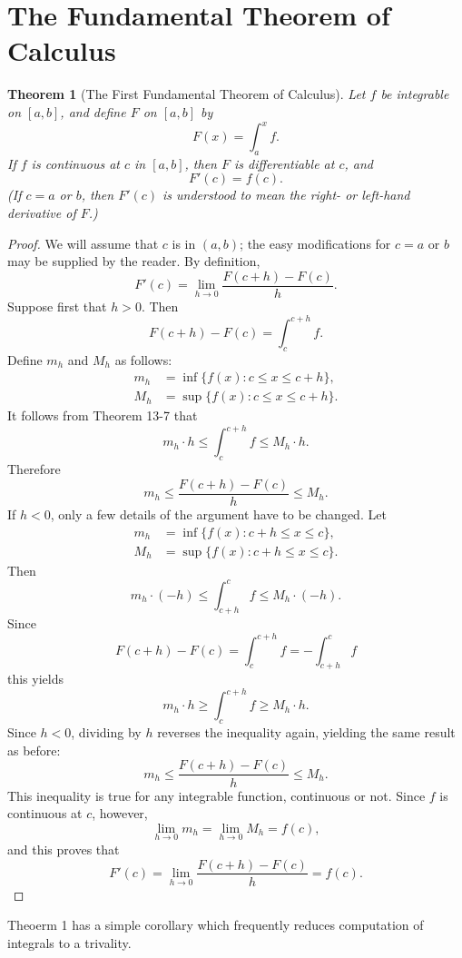 \documentclass{article}
\numberwithin{corollary}{subsection}
\numberwithin{definition}{subsection}
\numberwithin{lemma}{subsection}
\newtheorem{theorem}{Theorem}
\numberwithin{theorem}{subsection}
\begin{document}
\section{The Fundamental Theorem of Calculus}

\begin{theorem}[The First Fundamental Theorem of Calculus]
  Let $f$ be integrable on $[a, b]$, and define $F$ on $[a, b]$ by \[
    F(x) = \int_a^x f.
  \] If $f$ is continuous at $c$ in $[a, b]$, then $F$ is differentiable at
  $c$, and \[
    F'(c) = f(c).
  \] (If $c = a$ or $b$, then $F'(c)$ is understood to mean the right- or
  left-hand derivative of $F$.)
\end{theorem}
\begin{proof}
  We will assume that $c$ is in $(a, b)$; the easy modifications for $c = a$ or
  $b$ may be supplied by the reader. By definition, \[
    F'(c) = \lim_{h \to 0}\frac{F(c + h) - F(c)}{h}.
  \] Suppose first that $h > 0$. Then \[
    F(c + h) - F(c) = \int_c^{c + h} f.
  \] Define $m_h$ and $M_h$ as follows:
  \begin{align*}
    m_h &= \inf\{f(x): c \leq x \leq c + h\}, \\
    M_h &= \sup\{f(x): c \leq x \leq c + h\}.
  \end{align*}
  It follows from Theorem 13-7 that \[
    m_h \cdot h \leq \int_c^{c + h} f \leq M_h \cdot h.
  \] Therefore \[
    m_h \leq \frac{F(c + h) - F(c)}{h} \leq M_h.
  \] If $h < 0$, only a few details of the argument have to be changed. Let
  \begin{align*}
    m_h &= \inf\{f(x): c + h \leq x \leq c\}, \\
    M_h &= \sup\{f(x): c + h \leq x \leq c\}.
  \end{align*}
  Then \[
    m_h \cdot (-h) \leq \int_{c + h}^c f \leq M_h \cdot (-h).
  \] Since \[
    F(c + h) - F(c) = \int_c^{c + h} f = -\int_{c + h}^c f
  \] this yields \[
    m_h \cdot h \geq \int_c^{c + h} f \geq M_h \cdot h.
  \] Since $h < 0$, dividing by $h$ reverses the inequality again, yielding the
  same result as before: \[
    m_h \leq \frac{F(c + h) - F(c)}{h} \leq M_h.
  \] This inequality is true for any integrable function, continuous or not.
  Since $f$ is continuous at $c$, however, \[
    \lim_{h \to 0} m_h = \lim_{h \to 0} M_h = f(c),
  \] and this proves that \[
    F'(c) = \lim_{h \to 0} \frac{F(c + h) - F(c)}{h} = f(c).
  \]
\end{proof}

Theoerm 1 has a simple corollary which frequently reduces computation of
integrals to a trivality.
\end{document}
